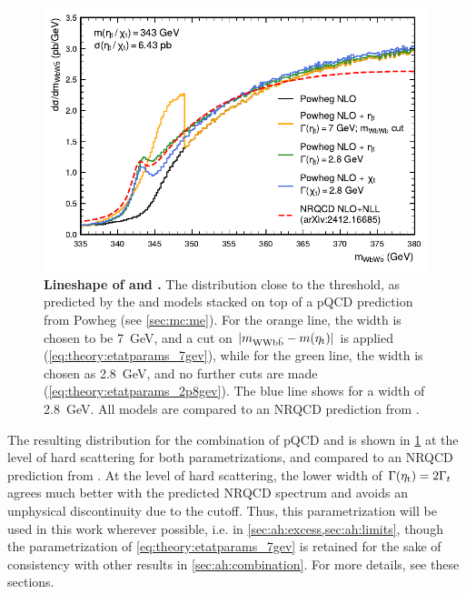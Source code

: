 \begin{figure}[t]
    \centering
    \includegraphics[width=0.8\linewidth]{figures/ah/powheg_etat_nlo.pdf}
    \caption{\textbf{Lineshape of \etat and \chit.} The \mWWbb distribution close to the \ttbar threshold, as predicted by the \etat and \chit models stacked on top of a pQCD \ttbar prediction from Powheg \hvq (see \cref{sec:mc:me}). For the orange line, the \etat width is chosen to be \SI{7}{\GeV}, and a cut on $|m_{\mathrm{WWb\bar{b}}} - m(\mathrm{\eta_t})|$ is applied (\cref{eq:theory:etatparams_7gev}), while for the green line, the \etat width is chosen as \SI{2.8}{\GeV}, and no further cuts are made (\cref{eq:theory:etatparams_2p8gev}). The blue line shows \chit for a width of \SI{2.8}{\GeV}. All models are compared to an NRQCD prediction from .}
    \label{fig:theory:etat}
\end{figure}

The resulting \mWWbb distribution for the combination of pQCD \ttbar and \etat is shown in \cref{fig:theory:etat} at the level of hard scattering for both parametrizations, and compared to an NRQCD prediction from .
At the level of hard scattering, the lower width of $\Gamma(\mathrm{\eta_t}) = 2 \Gamma_t$ agrees much better with the predicted NRQCD spectrum and avoids an unphysical discontinuity due to the \mWWbb cutoff. Thus, this parametrization will be used in this work wherever possible, i.e. in \cref{sec:ah:excess,sec:ah:limits}, though the parametrization of \cref{eq:theory:etatparams_7gev} is retained for the sake of consistency with other results in \cref{sec:ah:combination}. For more details, see these sections.

